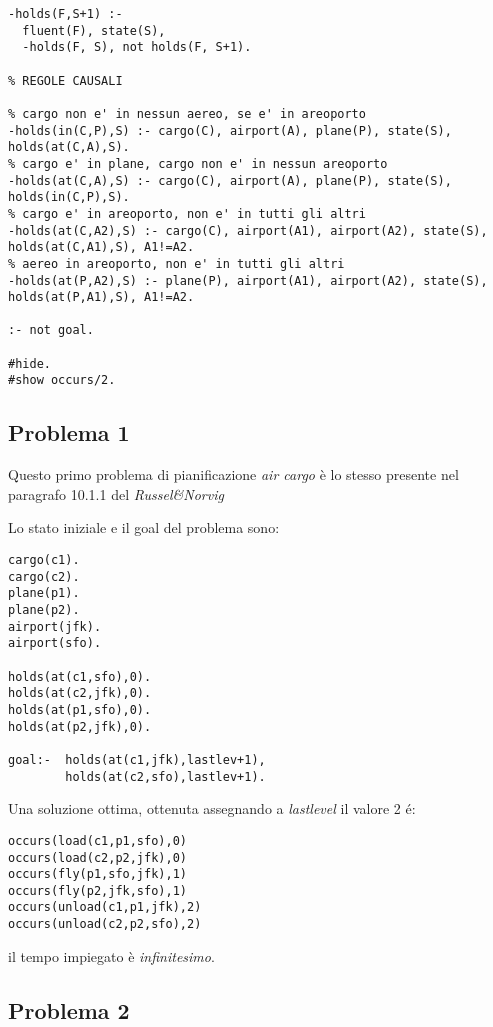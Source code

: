 \begin{lstlisting}
-holds(F,S+1) :-
  fluent(F), state(S),
  -holds(F, S), not holds(F, S+1).

% REGOLE CAUSALI

% cargo non e' in nessun aereo, se e' in areoporto
-holds(in(C,P),S) :- cargo(C), airport(A), plane(P), state(S), holds(at(C,A),S).
% cargo e' in plane, cargo non e' in nessun areoporto
-holds(at(C,A),S) :- cargo(C), airport(A), plane(P), state(S), holds(in(C,P),S).
% cargo e' in areoporto, non e' in tutti gli altri
-holds(at(C,A2),S) :- cargo(C), airport(A1), airport(A2), state(S), holds(at(C,A1),S), A1!=A2.
% aereo in areoporto, non e' in tutti gli altri
-holds(at(P,A2),S) :- plane(P), airport(A1), airport(A2), state(S), holds(at(P,A1),S), A1!=A2.

:- not goal.

#hide.
#show occurs/2.
\end{lstlisting}

\subsection{Problema 1}

Questo primo problema di pianificazione \emph{air cargo} è lo stesso presente nel paragrafo 10.1.1 del \emph{Russel\&Norvig}

Lo stato iniziale e il goal del problema sono:

\begin{lstlisting}
cargo(c1).
cargo(c2).
plane(p1).
plane(p2).
airport(jfk).
airport(sfo).

holds(at(c1,sfo),0).
holds(at(c2,jfk),0).
holds(at(p1,sfo),0).
holds(at(p2,jfk),0).

goal:-  holds(at(c1,jfk),lastlev+1),
        holds(at(c2,sfo),lastlev+1).

\end{lstlisting}

Una soluzione ottima, ottenuta assegnando a \emph{lastlevel} il valore 2 é:

\begin{lstlisting}
occurs(load(c1,p1,sfo),0)
occurs(load(c2,p2,jfk),0)
occurs(fly(p1,sfo,jfk),1)
occurs(fly(p2,jfk,sfo),1)
occurs(unload(c1,p1,jfk),2)
occurs(unload(c2,p2,sfo),2)
\end{lstlisting}

il tempo impiegato è \emph{infinitesimo}.

\subsection{Problema 2}

